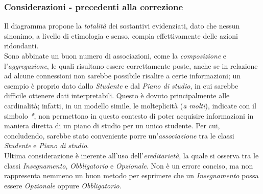 \documentclass{article}
\begin{document}
\subsubsection*{Considerazioni - precedenti alla correzione}
Il diagramma propone la \textit{totalità} dei sostantivi evidenziati, dato che nessun sinonimo, a livello di etimologia e senso, compia effettivamente delle azioni ridondanti.\\ Sono abbinate un buon numero di associazioni, come la \textit{composizione} e l'\textit{aggregazione}, le quali risultano essere correttamente poste, anche se in relazione ad alcune connessioni non sarebbe possibile risalire a certe informazioni; un esempio è proprio dato dallo \textit{Studente} e dal \textit{Piano di studio}, in cui sarebbe difficile ottenere dati interpretabili. Questo è dovuto principalmente alle cardinalità; infatti, in un modello simile, le molteplicità (\textit{a molti}), indicate con il simbolo \textit{*}, non permettono in questo contesto di poter acquisire informazioni in maniera diretta di un piano di studio per un unico studente. Per cui, concludendo, sarebbe stato conveniente porre un'\textit{associazione} tra le classi \textit{Studente} e \textit{Piano di studio}.\\ Ultima considerazione è inerente all'uso dell'\textit{ereditarietà}, la quale si osserva tra le classi \textit{Insegnamento}, \textit{Obbligatorio} e \textit{Opzionale}. Non è un errore conciso, ma non rappresenta nemmeno un buon metodo per esprimere che un \textit{Insegnamento} possa essere \textit{Opzionale} oppure \textit{Obbligatorio}.
\pagebreak
\end{document}
